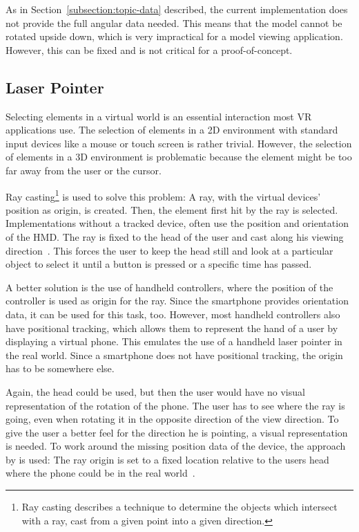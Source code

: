 As in Section~\ref{subsection:topic-data} described, the current implementation does not provide the full angular data needed. This means that the model cannot be rotated upside down, which is very impractical for a model viewing application. However, this can be fixed and is not critical for a proof-of-concept.


\subsection{Laser Pointer}\label{subsection:laser-pointer}

Selecting elements in a virtual world is an essential interaction most \ac{VR} applications use. The selection of elements in a \ac{2D} environment with standard input devices like a mouse or touch screen is rather trivial. However, the selection of elements in a \ac{3D} environment is problematic because the element might be too far away from the user or the cursor. 

Ray casting\footnote{Ray casting describes a technique to determine the objects which intersect with a ray, cast from a given point into a given direction.} is used to solve this problem: A ray, with the virtual devices' position as origin, is created. Then, the element first hit by the ray is selected. Implementations without a tracked device, often use the position and orientation of the \ac{HMD}. The ray is fixed to the head of the user and cast along his viewing direction~\cite[23]{Kamm.2018}. This forces the user to keep the head still and look at a particular object to select it until a button is pressed or a specific time has passed.


A better solution is the use of handheld controllers, where the position of the controller is used as origin for the ray. Since the smartphone provides orientation data, it can be used for this task, too. However, most handheld controllers also have positional tracking, which allows them to represent the hand of a user by displaying a virtual phone. This emulates the use of a handheld laser pointer in the real world. Since a smartphone does not have positional tracking, the origin has to be somewhere else.

Again, the head could be used, but then the user would have no visual representation of the rotation of the phone. The user has to see where the ray is going, even when rotating it in the opposite direction of the view direction. To give the user a better feel for the direction he is pointing, a visual representation is needed. 
To work around the missing position data of the device, the approach by \citeauthor{Pietroszek.2014} is used: The ray origin is set to a fixed location relative to the users head where the phone could be in the real world~\cite[Figure 3]{Pietroszek.2014}. 

